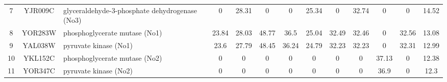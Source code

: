 \begin{table}[H]
\begin{center}
{\begin{tabular}{cclcccccccccc}
7             & YJR009C        & glyceraldehyde-3-phosphate  dehydrogenase   (No3) & 0                  & 28.31              & 0                 & 0                          & 25.34         & 0               & 32.74                  & 0               & 0                 & 14.52        \\
8             & YOR283W        & phosphoglycerate mutase (No1)                     & 23.84              & 28.03              & 48.77             & 36.5                       & 25.04         & 32.49           & 32.46                  & 0               & 32.56             & 13.08        \\
9             & YAL038W        & pyruvate kinase (No1)                             & 23.6               & 27.79              & 48.45             & 36.24                      & 24.79         & 32.23           & 32.23                  & 0               & 32.31             & 12.99        \\
10            & YKL152C        & phosphoglycerate mutase (No2)                     & 0                  & 0                  & 0                 & 0                          & 0             & 0               & 0                      & 37.13           & 0                 & 12.38        \\
11            & YOR347C        & pyruvate kinase (No2)                             & 0                  & 0                  & 0                 & 0                          & 0             & 0               & 0                      & 36.9            & 0                 & 12.3
\end{tabular}}
\label{table:cumulative_free_stds}
\end{center}
\end{table}
